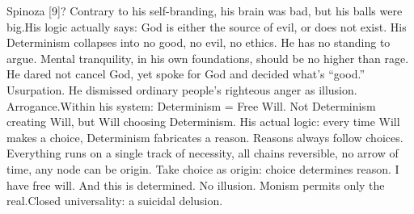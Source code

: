 \documentclass[11pt]{article}
\renewcommand{\\}[1][\mynewlineskip]{\oldnewline[#1]}
\begin{document}
\vspace{1em}
Spinoza [9]? Contrary to his self-branding, his brain was bad, but his balls were big.\\
His logic actually says: God is either the source of evil, or does not exist. His Determinism collapses into no good, no evil, no ethics. He has no standing to argue. Mental tranquility, in his own foundations, should be no higher than rage. He dared not cancel God, yet spoke for God and decided what's ``good.'' Usurpation. He dismissed ordinary people's righteous anger as illusion. Arrogance.\\
Within his system: Determinism = Free Will. Not Determinism creating Will, but Will choosing Determinism. His actual logic: every time Will makes a choice, Determinism fabricates a reason. Reasons always follow choices. Everything runs on a single track of necessity, all chains reversible, no arrow of time, any node can be origin. Take choice as origin: choice determines reason. I have free will. And this is determined. No illusion. Monism permits only the real.\\
Closed universality: a suicidal delusion.
\end{document}
